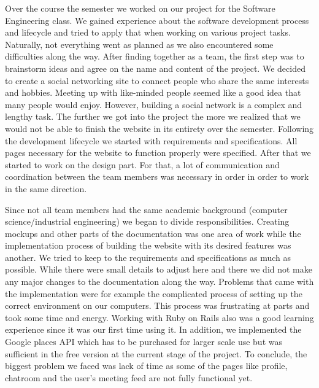 \documentclass[conference]{IEEEtran}
\begin{document}
Over the course the semester we worked on our project for the Software Engineering class. We gained experience about the software development process and lifecycle and tried to apply that when working on various project tasks. Naturally, not everything went as planned as we also encountered some difficulties along the way.
After finding together as a team, the first step was to brainstorm ideas and agree on the name and content of the project. We decided to create a social networking site to connect people who share the same interests and hobbies. Meeting up with like-minded people seemed like a good idea that many people would enjoy. However, building a social network is a complex and lengthy task. The further we got into the project the more we realized that we would not be able to finish the website in its entirety over the semester. 
Following the development lifecycle we started with requirements and specifications. All pages necessary for the website to function properly were specified. After that we started to work on the design part. For that, a lot of communication and coordination between the team members was necessary in order in order to work in the same direction.

Since not all team members had the same academic background (computer science/industrial engineering) we began to divide responsibilities. Creating mockups and other parts of the documentation was one area of work while the implementation process of building the website with its desired features was another. We tried to keep to the requirements and specifications as much as possible. While there were small details to adjust here and there we did not make any major changes to the documentation along the way. 
Problems that came with the implementation were for example the complicated process of setting up the correct environment on our computers. This process was frustrating at parts and took some time and energy. Working with Ruby on Rails also was a good learning experience since it was our first time using it. In addition, we implemented the Google places API which has to be purchased for larger scale use but was sufficient in the free version at the current stage of the project.
To conclude, the biggest problem we faced was lack of time as some of the pages like profile, chatroom and the user’s meeting feed are not fully functional yet. 
\end{document}
